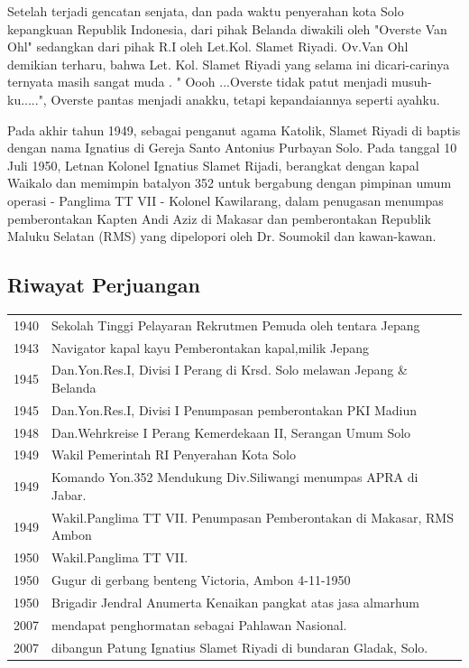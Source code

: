 Setelah terjadi gencatan senjata,  dan pada waktu penyerahan kota Solo kepangkuan Republik Indonesia,  dari pihak Belanda diwakili oleh "Overste Van Ohl" sedangkan dari pihak R.I oleh Let.Kol. Slamet Riyadi. Ov.Van Ohl demikian terharu, bahwa Let. Kol. Slamet Riyadi yang selama ini dicari-carinya ternyata masih sangat muda . " Oooh ...Overste tidak patut menjadi musuh-ku.....", Overste pantas menjadi anakku, tetapi kepandaiannya seperti ayahku.

Pada akhir tahun 1949, sebagai penganut agama Katolik, Slamet Riyadi di baptis dengan nama Ignatius di Gereja Santo Antonius Purbayan Solo. Pada tanggal 10 Juli 1950, Letnan Kolonel Ignatius Slamet Rijadi, berangkat dengan kapal Waikalo dan memimpin batalyon 352 untuk bergabung dengan pimpinan umum operasi - Panglima TT VII - Kolonel Kawilarang, dalam penugasan menumpas pemberontakan Kapten Andi Aziz di Makasar dan pemberontakan Republik Maluku Selatan (RMS) yang dipelopori oleh Dr. Soumokil dan kawan-kawan.

\subsection*{Riwayat Perjuangan}

\begin{tabular}{cp{9cm}}
1940&Sekolah Tinggi Pelayaran Rekrutmen Pemuda oleh tentara Jepang\\ 
1943&Navigator kapal kayu Pemberontakan kapal,milik Jepang \\
1945&Dan.Yon.Res.I, Divisi I Perang di Krsd. Solo melawan Jepang \& Belanda\\ 
1945&Dan.Yon.Res.I, Divisi I Penumpasan pemberontakan PKI Madiun \\
1948&Dan.Wehrkreise I Perang Kemerdekaan II, Serangan Umum Solo \\
1949&Wakil Pemerintah RI Penyerahan Kota Solo \\
1949&Komando Yon.352 Mendukung Div.Siliwangi menumpas APRA di Jabar.\\ 
1949&Wakil.Panglima TT VII. Penumpasan Pemberontakan di Makasar, RMS Ambon \\
1950&Wakil.Panglima TT VII. \\
1950&Gugur di gerbang benteng Victoria, Ambon 4-11-1950 \\

1950&Brigadir Jendral Anumerta Kenaikan pangkat atas jasa almarhum\\ 
2007&mendapat penghormatan sebagai Pahlawan Nasional. \\
2007&dibangun Patung Ignatius Slamet Riyadi di bundaran Gladak, Solo.\\
\end{tabular}